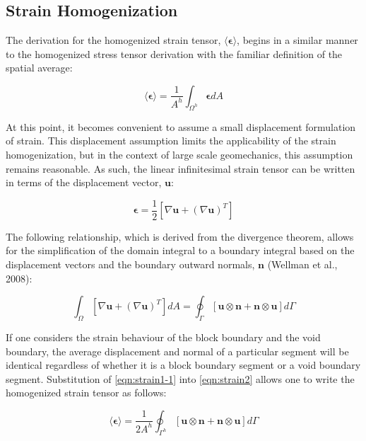 \subsection{Strain Homogenization}

The derivation for the homogenized strain tensor, $\langle\boldsymbol{\epsilon}\rangle$, begins in a similar manner to the homogenized stress tensor derivation with the familiar definition of the spatial average:

\begin{equation}
\langle\boldsymbol{\epsilon}\rangle=\frac{1}{A^{h}}\int_{\Omega^{h}}\boldsymbol{\epsilon}dA\label{eqn:strain2}
\end{equation}

At this point, it becomes convenient to assume a small displacement formulation of strain. This displacement assumption limits the applicability of the strain homogenization, but in the context of large scale geomechanics, this assumption remains reasonable. As such, the linear infinitesimal strain tensor can be written in terms of the displacement vector, $\mathbf{u}$:

\begin{equation}
\boldsymbol{\epsilon}=\frac{1}{2}\left[\nabla\mathbf{u}+\left(\nabla\mathbf{u}\right)^{T}\right]\label{eqn:strain1}
\end{equation}

The following relationship, which is derived from the divergence theorem, allows for the simplification of the domain integral to a boundary
integral based on the displacement vectors and the boundary outward normals, $\mathbf{n}$ (Wellman et al., 2008):

\begin{equation}
\int_{\Omega}\left[\nabla\mathbf{u}+\left(\nabla\mathbf{u}\right)^{T}\right]dA=\oint_{\Gamma}\left[\mathbf{u}\otimes\mathbf{n}+\mathbf{n}\otimes\mathbf{u}\right]d\Gamma\label{eqn:strain1-1}
\end{equation}

If one considers the strain behaviour of the block boundary and the void boundary, the average displacement and normal of a particular segment
will be identical regardless of whether it is a block boundary segment or a void boundary segment. Substitution of \ref{eqn:strain1-1} into \ref{eqn:strain2} allows one to write the homogenized strain tensor as follows:

\begin{equation}
\langle\boldsymbol{\epsilon}\rangle=\frac{1}{2A^{h}}\oint_{\Gamma^{h}}\left[\mathbf{u}\otimes\mathbf{n}+\mathbf{n}\otimes\mathbf{u}\right]d\Gamma\label{eqn:strain5-1}
\end{equation}


